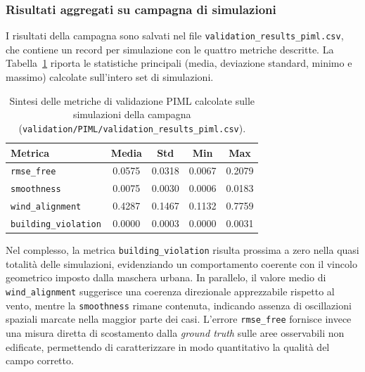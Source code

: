 \subsubsection{Risultati aggregati su campagna di simulazioni}
\label{sec:val_piml_results}

I risultati della campagna sono salvati nel file \texttt{validation\_results\_piml.csv}, che contiene un record per simulazione con le quattro metriche descritte.
La Tabella~\ref{tab:piml_validation_summary} riporta le statistiche principali (media, deviazione standard, minimo e massimo) calcolate sull’intero set di simulazioni.

\begin{table}[H]
    \centering
    \renewcommand{\arraystretch}{1.15}
    \begin{tabular}{lcccc}
        \toprule
        \textbf{Metrica}                 & \textbf{Media} & \textbf{Std} & \textbf{Min} & \textbf{Max} \\
        \midrule
        \texttt{rmse\_free}              & 0.0575         & 0.0318       & 0.0067       & 0.2079       \\
        \texttt{smoothness}              & 0.0075         & 0.0030       & 0.0006       & 0.0183       \\
        \texttt{wind\_alignment}         & 0.4287         & 0.1467       & 0.1132       & 0.7759       \\
        \texttt{building\_violation}     & 0.0000         & 0.0003       & 0.0000       & 0.0031       \\
        \bottomrule
    \end{tabular}
    \caption{Sintesi delle metriche di validazione PIML calcolate sulle simulazioni della campagna (\texttt{validation/PIML/validation\_results\_piml.csv}).}
    \label{tab:piml_validation_summary}
\end{table}

Nel complesso, la metrica \texttt{building\_violation} risulta prossima a zero nella quasi totalità delle simulazioni, evidenziando un comportamento coerente con il vincolo geometrico imposto dalla maschera urbana.
In parallelo, il valore medio di \texttt{wind\_alignment} suggerisce una coerenza direzionale apprezzabile rispetto al vento, mentre la \texttt{smoothness} rimane contenuta, indicando assenza di oscillazioni spaziali marcate nella maggior parte dei casi.
L’errore \texttt{rmse\_free} fornisce invece una misura diretta di scostamento dalla \textit{ground truth} sulle aree osservabili non edificate, permettendo di caratterizzare in modo quantitativo la qualità del campo corretto.

